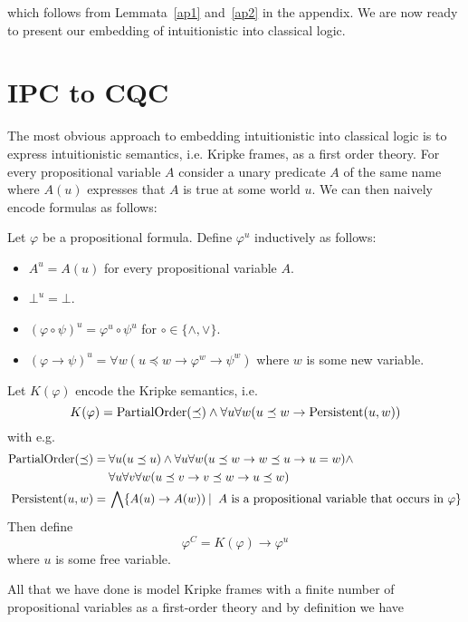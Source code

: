 \documentclass[a4paper,UKenglish,cleveref, autoref, thm-restate]{lipics-v2021}
\begin{document}
which follows from Lemmata~\ref{ap1} and~\ref{ap2} in the appendix. We are now ready to present our embedding of intuitionistic into classical logic.



\section{IPC to CQC}

The most obvious approach to embedding intuitionistic into classical logic is to express intuitionistic semantics, i.e. Kripke frames, as a first order theory. For every propositional variable $A$ consider a unary predicate $A$ of the same name where $A(u)$ expresses that $A$ is true at some world $u$. We can then naively encode formulas as follows:

\begin{definition}
	Let $\varphi$ be a propositional formula. Define $\varphi^{u}$ inductively as follows:
	\begin{itemize}
		\item $A^{u} = A(u)$ for every propositional variable $A$.
		\item $\bot^u = \bot$.
		\item $(\varphi\circ\psi)^u = \varphi^u\circ\psi^u$ for $\circ\in\{\wedge, \vee\}$.
		\item $(\varphi\to \psi)^u = \forall w(u\preceq w\to\varphi^{w}\to\psi^{w})$ where $w$ is some new variable.
	\end{itemize}
	Let $K(\varphi)$ encode the Kripke semantics, i.e.
	$$K(\varphi) = \text{\normalfont PartialOrder}(\preceq)\wedge\forall u\forall w(u\preceq w\to \text{\normalfont Persistent}(u, w))$$
	with e.g.
	\begin{align*}
		\text{\normalfont PartialOrder}(\preceq) =&\:\forall u(u\preceq u)\wedge\forall u\forall w(u\preceq w\to w\preceq u\to u = w)\wedge\\&\:\forall u\forall v\forall w(u\preceq v\to v\preceq w\to u\preceq w)\\
		\text{\normalfont Persistent}(u, w)=&\:\bigwedge \{A(u)\to A(w))\:|\: \text{ $A$ is a propositional variable that occurs in $\varphi$}\}
	\end{align*}
	Then define
	$$\varphi^{C} = K(\varphi)\to \varphi^{u}$$
	where $u$ is some free variable.
\end{definition}

All that we have done is model Kripke frames with a finite number of propositional variables as a first-order theory and by definition we have
\end{document}
